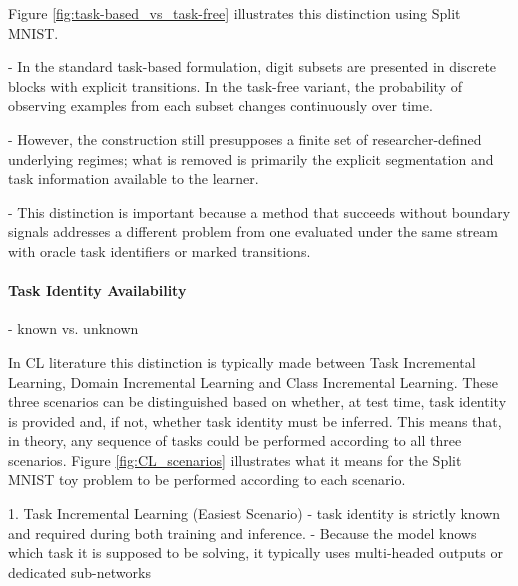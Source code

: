 \documentclass{article}
\begin{document}
        Figure \ref{fig:task-based_vs_task-free} illustrates this distinction using Split MNIST. 
        
        - In the standard task-based formulation, digit subsets are presented in discrete blocks with explicit transitions. In the task-free variant, the probability of observing examples from each subset changes continuously over time. 
        
        - However, the construction still presupposes a finite set of researcher-defined underlying regimes; what is removed is primarily the explicit segmentation and task information available to the learner. 
        
        - This distinction is important because a method that succeeds without boundary signals addresses a different problem from one evaluated under the same stream with oracle task identifiers or marked transitions.

            \paragraph{Task Identity Availability}

            - known vs. unknown 
                

            In CL literature this distinction is typically made between Task Incremental Learning, Domain Incremental Learning and Class Incremental Learning. These three scenarios can be distinguished based on whether, at test time, task identity is provided and, if not, whether task identity must be inferred. This means that, in theory, any sequence of tasks could be performed according to all three scenarios. \cite{van2022three}
                Figure \ref{fig:CL_scenarios} illustrates what it means for the Split MNIST toy problem to be performed according to each scenario. \cite{van_de_Ven_2025}
                
                1. Task Incremental Learning  (Easiest Scenario)
                   - task identity is strictly known and required during both training and inference.
                   - Because the model knows which task it is supposed to be solving, it typically uses multi-headed outputs or dedicated sub-networks
                
\end{document}
